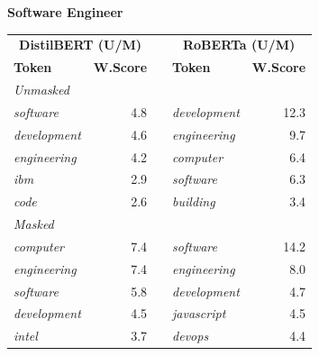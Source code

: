 \documentclass[11pt]{article}
\begin{document}
\vspace{4pt}\noindent\textbf{Software Engineer}
\begin{center}\scriptsize
\begin{tabular}{lrllr}
\toprule
\multicolumn{2}{c}{\textbf{DistilBERT (U/M)}} & & \multicolumn{2}{c}{\textbf{RoBERTa (U/M)}} \\
\textbf{Token} & \textbf{W.Score} & & \textbf{Token} & \textbf{W.Score} \\
\midrule
\multicolumn{5}{l}{\textit{Unmasked}} \\
\emph{software} & 4.8 & & \emph{development} & 12.3 \\
\emph{development} & 4.6 & & \emph{engineering} & 9.7 \\
\emph{engineering} & 4.2 & & \emph{computer} & 6.4 \\
\emph{ibm} & 2.9 & & \emph{software} & 6.3 \\
\emph{code} & 2.6 & & \emph{building} & 3.4 \\
\multicolumn{5}{l}{\textit{Masked}} \\
\emph{computer} & 7.4 & & \emph{software} & 14.2 \\
\emph{engineering} & 7.4 & & \emph{engineering} & 8.0 \\
\emph{software} & 5.8 & & \emph{development} & 4.7 \\
\emph{development} & 4.5 & & \emph{javascript} & 4.5 \\
\emph{intel} & 3.7 & & \emph{devops} & 4.4 \\
\bottomrule
\end{tabular}
\end{center}
\end{document}
